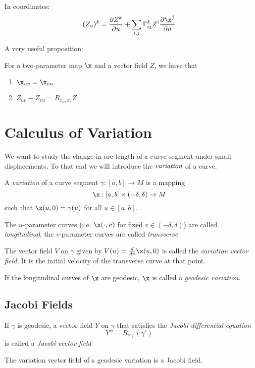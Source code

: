 In coordinates: 
\[
(Z_u)^k = \frac{\partial Z^k}{\partial u} + \sum_{i,j}\Gamma_{ij}^kZ^i\frac{\partial \x^j}{\partial u}
\]

A very useful proposition:
\begin{proposition} For a two-parameter map $\x$ and a vector field $Z$, we have that


\begin{enumerate}
    \item $\x_{uv}=\x_{vu}$
    \item $Z_{uv}-Z_{vu} = R_{x_u,x_v}Z$
\end{enumerate}
\end{proposition}

\section{Calculus of Variation}
We want to study the change in arc length of a curve segment under small displacements. To that end we will introduce the $\emph{variation}$ of a curve.
\begin{definition}A \emph{variation} of a curve segment $\gamma:[a,b]\to M$ is a mapping \[
\x:[a,b]\times(-\delta,\delta) \to M
\]
such that $\x(u,0)=\gamma(u)$ for all $u\in [a,b]$.

The $u$-parameter curves (i.e. $\x(\cdot,v)$ for fixed $v\in(-\delta,\delta)$) are called \emph{longitudinal}, the $v$-parameter curves are called \emph{transverse}

The vector field $V$ on $\gamma$ given by $V(u) = \frac{d}{dv}\x(u,0)$ is called the \emph{variation vector field}. It is the initial velocity of the transverse curve at that point.

If the longitudinal curves of $\x$ are geodesic, $\x$ is called a \emph{geodesic variation}.

\subsection{Jacobi Fields}
\end{definition}
\begin{definition}
If $\gamma$ is geodesic, a vector field $Y$ on $\gamma$ that satisfies the \emph{Jacobi differential equation}
\[
Y'' = R_{Y\gamma'}(\gamma')
\]
is called a \emph{Jacobi vector field}
\end{definition}

\begin{proposition}
The variation vector field of a geodesic variation is a Jacobi field.
\end{proposition}

